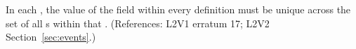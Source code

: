 In each \Event, the value of the  field within every
\EventAssignment definition must be unique across the set of all
\EventAssignment{}s within that \Event.  (References: L2V1 erratum 17; L2V2
Section~\ref{sec:events}.)

